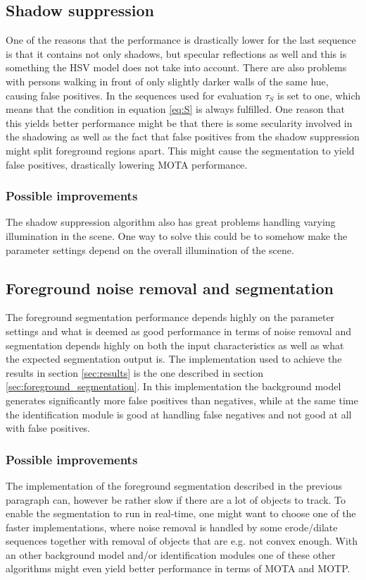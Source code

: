 


\subsection{Shadow suppression}
One of the reasons that the performance is drastically lower for the last sequence is that it contains not only shadows, but specular reflections as well and this is something the HSV model does not take into account. There are also problems with persons walking in front of only slightly darker walls of the same hue, causing false positives. In the sequences used for evaluation $\tau_S$ is set to one, which means that the condition in equation \eqref{eq:S} is always fulfilled. One reason that this yields better performance might be that there is some secularity involved in the shadowing as well as the fact that false positives from the shadow suppression might split foreground regions apart. This might cause the segmentation to yield false positives, drastically lowering MOTA performance.

\subsubsection{Possible improvements}
The shadow suppression algorithm also has great problems handling varying illumination in the scene. One way to solve this could be to somehow make the parameter settings depend on the overall illumination of the scene. 

\subsection{Foreground noise removal and segmentation}
The foreground segmentation performance depends highly on the parameter settings and what is deemed as good performance in terms of noise removal and segmentation depends highly on both the input characteristics as well as what the expected segmentation output is. The implementation used to achieve the results in section \ref{sec:results}  is the one  described in section \ref{sec:foreground_segmentation}. In this implementation the background model generates significantly more false positives than negatives, while at the same time the identification module is good at handling false negatives and not good at all with false positives. 

\subsubsection{Possible improvements}
The implementation of the foreground segmentation described in the previous paragraph can, however be rather slow if there are a lot of objects to track. To enable the segmentation to run in real-time, one might want to choose one of the faster implementations, where noise removal is handled by some erode/dilate sequences together with removal of objects that are e.g. not convex enough. With an other background model and/or identification modules one of these other algorithms might even yield better performance in terms of MOTA and MOTP.

